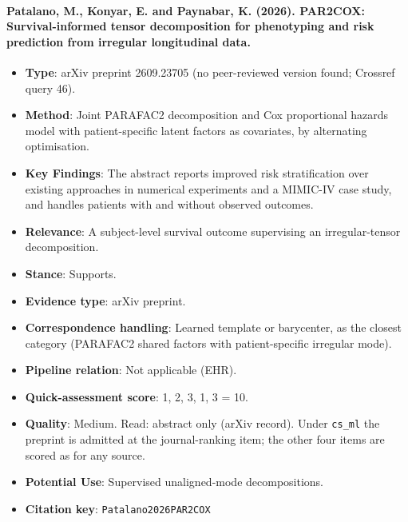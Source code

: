\documentclass[journal,onecolumn]{IEEEtran}
\begin{document}
\paragraph{Patalano, M., Konyar, E. and Paynabar, K. (2026). PAR2COX: Survival-informed tensor decomposition for phenotyping and risk prediction from irregular longitudinal data.~\cite{Patalano2026PAR2COX}}\mbox{}

\begin{itemize}

\item{} \textbf{Type}: arXiv preprint 2609.23705 (no peer-reviewed version found; Crossref query 46).

\item{} \textbf{Method}: Joint PARAFAC2 decomposition and Cox proportional hazards model with patient-specific latent factors as covariates, by alternating optimisation.

\item{} \textbf{Key Findings}: The abstract reports improved risk stratification over existing approaches in numerical experiments and a MIMIC-IV case study, and handles patients with and without observed outcomes.

\item{} \textbf{Relevance}: A subject-level survival outcome supervising an irregular-tensor decomposition.

\item{} \textbf{Stance}: Supports.

\item{} \textbf{Evidence type}: arXiv preprint.

\item{} \textbf{Correspondence handling}: Learned template or barycenter, as the closest category (PARAFAC2 shared factors with patient-specific irregular mode).

\item{} \textbf{Pipeline relation}: Not applicable (EHR).

\item{} \textbf{Quick-assessment score}: 1, 2, 3, 1, 3 = 10.

\item{} \textbf{Quality}: Medium. Read: abstract only (arXiv record). Under \texttt{cs\_ml} the preprint is admitted at the journal-ranking item; the other four items are scored as for any source.

\item{} \textbf{Potential Use}: Supervised unaligned-mode decompositions.

\item{} \textbf{Citation key}: \texttt{Patalano2026PAR2COX}

\end{itemize}
\end{document}
